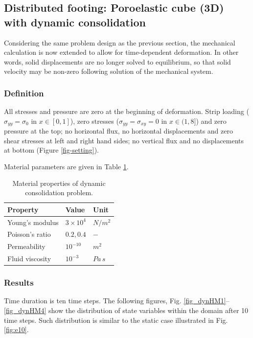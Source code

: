 \subsection{Distributed footing: Poroelastic cube (3D) with dynamic consolidation}
Considering the same problem design as the previous section, the mechanical calculation is now extended to allow for time-dependent deformation. In other words, solid displacements are no longer solved to equilibrium, so that solid velocity may be non-zero following solution of the mechanical system.

\subsubsection*{Definition}
All stresses and pressure are zero at the beginning of deformation. Strip
loading ($\sigma_{yy}=\sigma_0$ in $x\in[0,1]$), zero stresses
($\sigma_{yy}=\sigma_{xy}=0$ in $x\in(1,8]$) and zero pressure at
the top; no horizontal flux, no horizontal displacements and zero
shear stresses at left and right hand sides; no vertical flux and no
displacements at bottom (Figure \ref{fig-setting}).

Material parameters are given in Table \ref{tab:mat-dynam}.

\begin{table}[!htb]
\begin{center}
\begin{tabular}{lll}
\hline{\smallskip}
Property & Value & Unit \\
\hline
Young's modulus & $3\times 10^{4}$  & $N/m^{2}$ \\
Poisson's ratio & $0.2, 0.4$       & $-$ \\
Permeability    & $10^{-10}$        & $m^2$ \\
Fluid viscosity & $10^{-3}$         & $Pa\,s$ \\
\hline
\end{tabular}
\end{center}
\caption{Material properties of dynamic consolidation problem.}
\label{tab:mat-dynam}
\end{table}

\subsubsection*{Results}
Time duration is ten time steps. The following figures, Fig. \ref{fig_dynHM1}--\ref{fig_dynHM4} show the distribution of state variables within the domain after 10 time steps. Such distribution is similar to the static case illustrated in Fig. \ref{fig:e10}.
 
